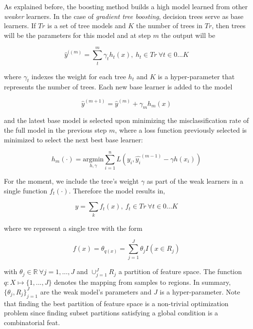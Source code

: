 As explained before, the boosting method builds a high model learned from other \textit{weaker} learners. In the case of \textit{gradient tree boosting}, decision trees serve as base learners. If $Tr$ is a set of tree models and $K$ the number of trees in $Tr$, then trees will be the parameters for this model and at step $m$ the output will be

\begin{equation}
\hat{y}^{((m)}= \sum_t^m \gamma_t h_t(x) , \ h_t \in Tr \ \forall t \in {0...K}
\end{equation}

where $\gamma_t$ indexes the weight for each tree $h_t$ and $K$ is a hyper-parameter that represents the number of trees. Each new base learner is added to the model

\begin{equation}
\hat{y}^{(m+1)} =  \hat{y}^{(m)} + \gamma_m h_m(x)
\end{equation}

and the latest base model is selected upon minimizing the misclassification rate of the full model in the previous step $m$, where a loss function previously selected is minimized to select the next best base learner:

\begin{equation}
h_m(\cdot) = \underset{h,\gamma}{\mathrm{argmin}}  \sum_{i=1}^{n} L ( y_i, \hat{y_i}^{(m-1)} - \gamma h(x_i) )
\end{equation}


For the moment, we include the tree's weight $\gamma$ as part of the weak learners in a single function $f_t(\cdot)$. Therefore the model results in,

\begin{equation}
y = \sum_k f_t(x) , \ f_t \in Tr \ \forall t \in {0...K}
\end{equation}

where we represent a single tree with the form

\begin{equation}
f(x) = \theta_{q(x)} = \sum_{j=1}^J \theta_j I(x \in R_j)
\end{equation}

with $\theta_j \in \mathbb{R} \ \forall j = 1,...,J$ and $ \cup_{j=1}^J R_j$ a partition of feature space. The function $q : X \mapsto \{1,...,J\}$ denotes the mapping from samples to regions. In summary, $\{\theta_j, R_j\}_{j=1}^J$ are the weak model's parameters and $J$ is a hyper-parameter. Note that finding the best partition of feature space is a non-trivial optimization problem since finding subset partitions satisfying a global condition is a combinatorial feat.

